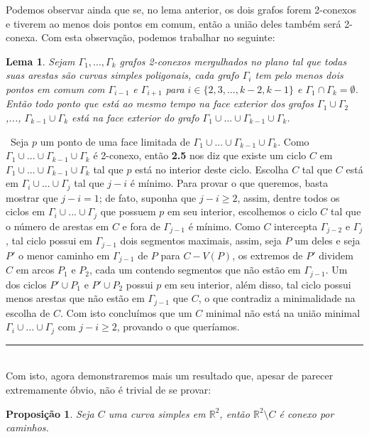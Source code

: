 \documentclass[12pt,a4paper]{article}
\newtheorem{lem}[mydef]{Lema}
\newtheorem{prop}[mydef]{Proposição}
\def\dem{\par\smallbreak\noindent {\textit{ Demonstração:}} \ }
\def\eop{\hfill\rule{2.5mm}{2.5mm} \\ }
\theoremstyle{definition}
\begin{document}
Podemos observar ainda que se, no lema anterior, os dois grafos forem 2-conexos e tiverem ao menos dois pontos em comum, então a união deles também será 2-conexa. Com esta observação, podemos trabalhar no seguinte:

\begin{lem}
 
    Sejam $\Gamma_1,...,\Gamma_k$ grafos 2-conexos mergulhados no plano tal que todas suas arestas são curvas simples poligonais, cada grafo $\Gamma_i$ tem pelo menos dois pontos em comum com $\Gamma_{i-1}$ e $\Gamma_{i+1}$ para $i\in \{2,3,...,k-2,k-1\}$ e $\Gamma_1\cap \Gamma_k = \emptyset$. Então todo ponto que está ao mesmo tempo na face exterior dos grafos $\Gamma_1\cup \Gamma_2$,..., $\Gamma_{k-1}\cup \Gamma_k$ está na face exterior do grafo $\Gamma_1 \cup ... \cup \Gamma_{k-1}\cup \Gamma_k$.
 
\end{lem}
 
\dem Seja $p$ um ponto de uma face limitada de $\Gamma_1 \cup ... \cup \Gamma_{k-1}\cup \Gamma_k$. Como $\Gamma_1 \cup ... \cup \Gamma_{k-1}\cup \Gamma_k$ é 2-conexo, então \textbf{2.5} nos diz que existe um ciclo $C$ em $\Gamma_1 \cup ... \cup \Gamma_{k-1}\cup \Gamma_k$ tal que $p$ está no interior deste ciclo. Escolha $C$ tal que $C$ está em $\Gamma_i \cup ... \cup \Gamma_j$ tal que $j-i$ é mínimo. Para provar o que queremos, basta mostrar que $j-i=1$; de fato, suponha que $j-i\geq 2$, assim, dentre todos os ciclos em $\Gamma_i \cup ... \cup \Gamma_j$ que possuem $p$ em seu interior, escolhemos o ciclo $C$ tal que o número de arestas em $C$ e fora de $\Gamma_{j-1}$ é mínimo. Como $C$ intercepta $\Gamma_{j-2}$ e $\Gamma_j$, tal ciclo possui em $\Gamma_{j-1}$ dois segmentos maximais, assim, seja $P$ um deles e seja $P'$ o menor caminho em $\Gamma_{j-1}$ de $P$ para $C-V(P)$, os extremos de $P'$ dividem $C$ em arcos $P_1$ e $P_2$, cada um contendo segmentos que não estão em $\Gamma_{j-1}$. Um dos ciclos $P'\cup P_1$ e $P'\cup P_2$ possui $p$ em seu interior, além disso, tal ciclo possui menos arestas que não estão em $\Gamma_{j-1}$ que $C$, o que contradiz a minimalidade na escolha de $C$. Com isto concluímos que um $C$ minimal não está na união minimal $\Gamma_i \cup ... \cup \Gamma_j$ com $j-i\geq 2$, provando o que queríamos. \eop

Com isto, agora demonstraremos mais um resultado que, apesar de parecer extremamente óbvio, não é trivial de se provar:

\begin{prop}

    Seja $C$ uma curva simples em $\mathbb{R}^2$, então $\mathbb{R}^2\setminus C$ é conexo por caminhos. 

\end{prop}
\end{document}
